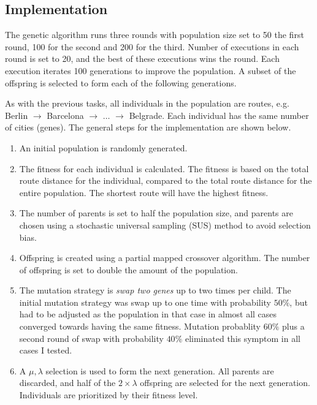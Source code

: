 \documentclass{article}
\begin{document}
\subsection*{Implementation}

The genetic algorithm runs three rounds with population size set to 50 the first round, 100 for the second and 200 for the third. Number of executions in each round is set to 20, and the best of these executions wins the round. Each execution iterates 100 generations to improve the population. A subset of the offspring is selected to form each of the following generations.

As with the previous tasks, all individuals in the population are routes, e.g. Berlin $\rightarrow$ Barcelona $\rightarrow$ $\ldots$ $\rightarrow$ Belgrade. Each individual has the same number of cities (genes). The general steps for the implementation are shown below.

\begin{enumerate}
    \item An initial population is randomly generated.
    \item The fitness for each individual is calculated. The fitness is based on the total route distance for the individual, compared to the total route distance for the entire population. The shortest route will have the highest fitness.
    \item The number of parents is set to half the population size, and parents are chosen using a stochastic universal sampling (SUS) method to avoid selection bias.
    \item Offspring is created using a partial mapped crossover algorithm. The number of offspring is set to double the amount of the population.
    \item The mutation strategy is \textit{swap two genes} up to two times per child. The initial mutation strategy was swap up to one time with probability $50\%$, but had to be adjusted as the population in that case in almost all cases converged towards having the same fitness. Mutation probablity $60\%$ plus a second round of swap with probability $40\%$ eliminated this symptom in all cases I tested.
    \item A $\mu,\lambda$ selection is used to form the next generation. All parents are discarded, and half of the $2 \times \lambda$ offspring are selected for the next generation. Individuals are prioritized by their fitness level.
\end{enumerate}
\end{document}
